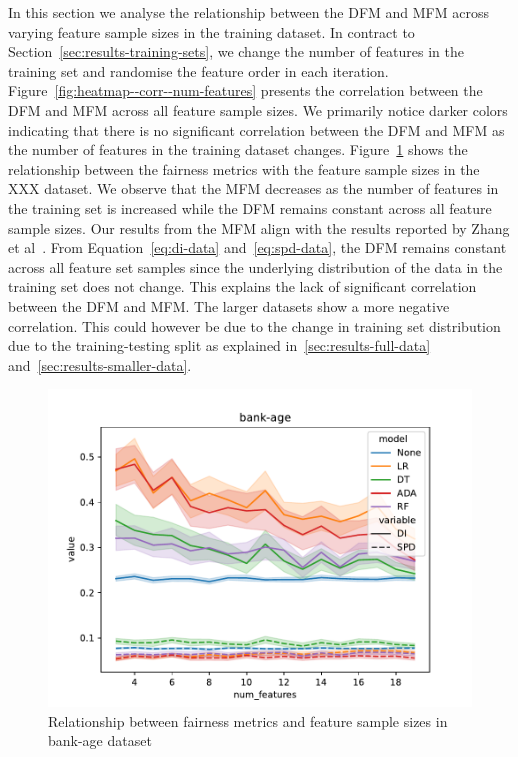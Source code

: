 \documentclass{article}
\begin{document}
In this section we analyse the relationship between the DFM and MFM
across varying feature sample sizes in the training dataset. In
contract to Section \ref{sec:results-training-sets}, we change the
number of features in the training set and randomise the feature order
in each iteration. Figure \ref{fig:heatmap--corr--num-features}
presents the correlation between the DFM and MFM across all feature
sample sizes. We primarily notice darker colors indicating that there
is no significant correlation between the DFM and MFM as the number of
features in the training dataset changes.
Figure \ref{fig:lineplot--num-features--di-spd--bank-age} shows the
relationship between the fairness metrics with the feature sample
sizes in the XXX dataset. We observe that the MFM decreases as the
number of features in the training set is increased while the DFM
remains constant across all feature sample sizes. Our results from the
MFM align with the results reported by Zhang et
al \cite{zhang2021ignorance}. From Equation \ref{eq:di-data}
and \ref{eq:spd-data}, the DFM remains constant across all feature set
samples since the underlying distribution of the data in the training
set does not change. This explains the lack of significant correlation
between the DFM and MFM. The larger datasets show a more negative
correlation. This could however be due to the change in training set
distribution due to the training-testing split as explained
in \ref{sec:results-full-data} and \ref{sec:results-smaller-data}.

\begin{figure}
  \centering
  \includegraphics[width=0.95\linewidth]{lineplot--num-features--di-spd--bank-age.pdf}
  \caption{Relationship between fairness metrics and feature sample
    sizes in bank-age dataset}
  \label{fig:lineplot--num-features--di-spd--bank-age}
\end{figure}
\end{document}
